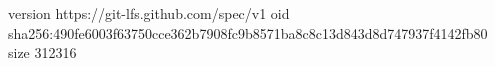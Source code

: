 version https://git-lfs.github.com/spec/v1
oid sha256:490fe6003f63750cce362b7908fc9b8571ba8c8c13d843d8d747937f4142fb80
size 312316

